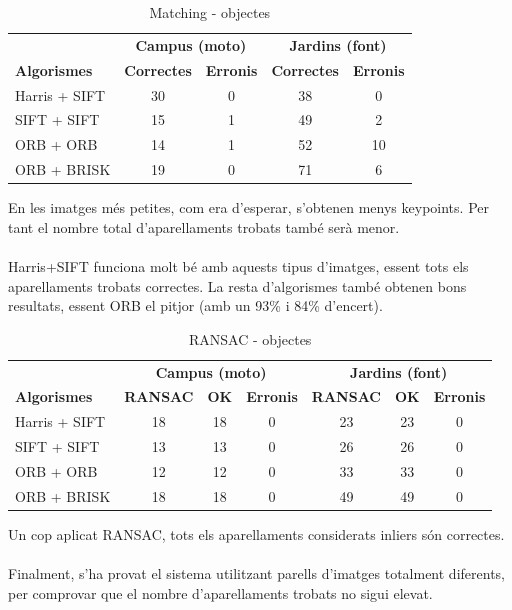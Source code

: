 		\begin{table}[H]
			\begin{center}
				\begin{tabular}{l | c c | c c}
					& \multicolumn{2}{c|}{\textbf{Campus (moto)}} & \multicolumn{2}{c}{\textbf{Jardins (font)}} \\
					\textbf{Algorismes} & \textbf{Correctes} & \textbf{Erronis} & \textbf{Correctes} & \textbf{Erronis} \\ \hline
					Harris + SIFT & 30 & 0 & 38 & 0 \\
					SIFT + SIFT & 15 & 1 & 49 & 2 \\
					ORB + ORB & 14 & 1 & 52 & 10 \\
					ORB + BRISK & 19 & 0 & 71 & 6 \\
				\end{tabular}
			\end{center}
			\caption{Matching - objectes}
		\end{table}
		\noindent
		En les imatges més petites, com era d'esperar, s'obtenen menys keypoints. Per tant el nombre total d'aparellaments trobats també serà menor.\\\\
		Harris+SIFT funciona molt bé amb aquests tipus d'imatges, essent tots els aparellaments trobats correctes. La resta d'algorismes també obtenen bons resultats,
		essent ORB el pitjor (amb un 93\% i 84\% d'encert).\\
		\begin{table}[H]
			\begin{center}
				\begin{tabular}{l | c c c | c c c}
					& \multicolumn{3}{c|}{\textbf{Campus (moto)}} & \multicolumn{3}{c}{\textbf{Jardins (font)}} \\
					\textbf{Algorismes} & \textbf{RANSAC} & \textbf{OK} & \textbf{Erronis} & \textbf{RANSAC} & \textbf{OK} & \textbf{Erronis} \\ \hline
					Harris + SIFT & 18 & 18 & 0 & 23 & 23 & 0 \\
					SIFT + SIFT & 13 & 13 & 0 & 26 & 26 & 0 \\
					ORB + ORB & 12 & 12 & 0 & 33 & 33 & 0 \\
					ORB + BRISK & 18 & 18 & 0 & 49 & 49 & 0 \\
				\end{tabular}
			\end{center}
			\caption{RANSAC - objectes}
		\end{table}
		\noindent
		Un cop aplicat RANSAC, tots els aparellaments considerats inliers són correctes.\\\\
		Finalment, s'ha provat el sistema utilitzant parells d'imatges totalment diferents, per comprovar que el nombre d'aparellaments trobats no sigui elevat.\\

